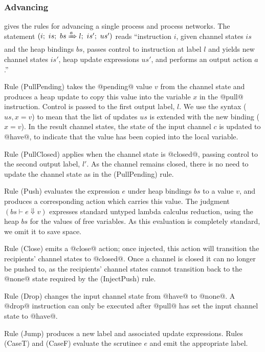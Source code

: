


\subsubsection{Advancing}
 gives the rules for advancing a single process and process networks.
The statement $(i;~is;~bs \xRightarrow{a} l;~is';~us')$ reads ``instruction $i$, given channel states $is$ and the heap bindings $bs$, passes control to instruction at label $l$ and yields new channel states $is'$, heap update expressions $us'$, and performs an output action $a$.''

Rule (PullPending) takes the @pending@ value $v$ from the channel state and produces a heap update to copy this value into the variable $x$ in the @pull@ instruction.
Control is passed to the first output label, $l$.
We use the syntax ($us,x=v$) to mean that the list of updates $us$ is extended with the new binding ($x=v$).
In the result channel states, the state of the input channel $c$ is updated to @have@, to indicate that the value has been copied into the local variable.

Rule (PullClosed) applies when the channel state is @closed@, passing control to the second output label, $l'$.
As the channel remains closed, there is no need to update the channel state as in the (PullPending) rule.

Rule (Push) evaluates the expression $e$ under heap bindings $bs$ to a value $v$, and produces a corresponding action which carries this value.
The judgment $(bs \vdash e \Downarrow v)$ expresses standard untyped lambda calculus reduction, using the heap $bs$ for the values of free variables.
As this evaluation is completely standard, we omit it to save space.

Rule (Close) emits a @close@ action; once injected, this action will transition the recipients' channel states to @closed@.
Once a channel is closed it can no longer be pushed to, as the recipients' channel states cannot transition back to the @none@ state required by the (InjectPush) rule.

Rule (Drop) changes the input channel state from @have@ to @none@. A @drop@ instruction can only be executed after @pull@ has set the input channel state to @have@.

Rule (Jump) produces a new label and associated update expressions. Rules (CaseT) and (CaseF) evaluate the scrutinee $e$ and emit the appropriate label.

